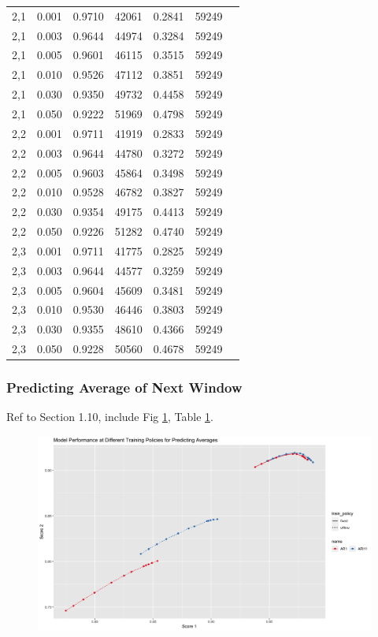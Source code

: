 \documentclass{article}
\begin{document}
\begin{longtable}[htbp]{l|l|l|*{4}{c}}
    2,1 & 0.001 & 0.9710 & 42061 & 0.2841 & 59249\\
    2,1 & 0.003 & 0.9644 & 44974 & 0.3284 & 59249\\
    2,1 & 0.005 & 0.9601 & 46115 & 0.3515 & 59249\\
    2,1 & 0.010 & 0.9526 & 47112 & 0.3851 & 59249\\
    2,1 & 0.030 & 0.9350 & 49732 & 0.4458 & 59249\\
    2,1 & 0.050 & 0.9222 & 51969 & 0.4798 & 59249\\
    2,2 & 0.001 & 0.9711 & 41919 & 0.2833 & 59249\\
    2,2 & 0.003 & 0.9644 & 44780 & 0.3272 & 59249\\
    2,2 & 0.005 & 0.9603 & 45864 & 0.3498 & 59249\\
    2,2 & 0.010 & 0.9528 & 46782 & 0.3827 & 59249\\
    2,2 & 0.030 & 0.9354 & 49175 & 0.4413 & 59249\\
    2,2 & 0.050 & 0.9226 & 51282 & 0.4740 & 59249\\
    2,3 & 0.001 & 0.9711 & 41775 & 0.2825 & 59249\\
    2,3 & 0.003 & 0.9644 & 44577 & 0.3259 & 59249\\
    2,3 & 0.005 & 0.9604 & 45609 & 0.3481 & 59249\\
    2,3 & 0.010 & 0.9530 & 46446 & 0.3803 & 59249\\
    2,3 & 0.030 & 0.9355 & 48610 & 0.4366 & 59249\\
    2,3 & 0.050 & 0.9228 & 50560 & 0.4678 & 59249\\
\end{longtable}

\subsubsection{Predicting Average of Next Window}
Ref to Section 1.10, include Fig \ref{fig:fig1.10.1}, Table \ref{fig:fig1.10.1}.

\begin{figure}
    \caption{}
    \centering
    \includegraphics{images/ModelPerformanceatDifferentTrainingPoliciesforPredictingAverages.png}
    \label{fig:fig1.10.1}
\end{figure}
\end{document}
